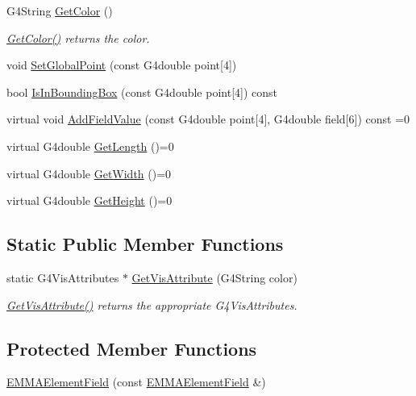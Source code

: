 \begin{DoxyCompactItemize}
G4\+String \hyperlink{classEMMAElementField_a0a67e3bc2f8393d62ee76503f9aeaf7c}{Get\+Color} ()
\begin{DoxyCompactList}\small\item\em \hyperlink{classEMMAElementField_a0a67e3bc2f8393d62ee76503f9aeaf7c}{Get\+Color()} returns the color. \end{DoxyCompactList}\item 
void \hyperlink{classEMMAElementField_af4362c2dbb660e9eaab6d9207e29acda}{Set\+Global\+Point} (const G4double point\mbox{[}4\mbox{]})
\item 
bool \hyperlink{classEMMAElementField_aabb0a5f52245b11bcd16efa8c9dc7338}{Is\+In\+Bounding\+Box} (const G4double point\mbox{[}4\mbox{]}) const 
\item 
virtual void \hyperlink{classEMMAElementField_acec8d9002f079755715ffd5b7ba7e900}{Add\+Field\+Value} (const G4double point\mbox{[}4\mbox{]}, G4double field\mbox{[}6\mbox{]}) const =0
\item 
virtual G4double \hyperlink{classEMMAElementField_adb2d90c3fdf25e17be541903bffca35b}{Get\+Length} ()=0
\item 
virtual G4double \hyperlink{classEMMAElementField_a41708a8f1e72d7788c0a53c80c297bf9}{Get\+Width} ()=0
\item 
virtual G4double \hyperlink{classEMMAElementField_a3cbd223805ba24b5313e16ca540c326c}{Get\+Height} ()=0
\end{DoxyCompactItemize}
\subsection*{Static Public Member Functions}
\begin{DoxyCompactItemize}
\item 
static G4\+Vis\+Attributes $\ast$ \hyperlink{classEMMAElementField_adcc4e33f5615dbf4266823277281bf79}{Get\+Vis\+Attribute} (G4\+String color)
\begin{DoxyCompactList}\small\item\em \hyperlink{classEMMAElementField_adcc4e33f5615dbf4266823277281bf79}{Get\+Vis\+Attribute()} returns the appropriate G4\+Vis\+Attributes. \end{DoxyCompactList}\end{DoxyCompactItemize}
\subsection*{Protected Member Functions}
\begin{DoxyCompactItemize}
\item 
\hyperlink{classEMMAElementField_a6b53a26e3a5e14a3d9eaec5b9c257c31}{E\+M\+M\+A\+Element\+Field} (const \hyperlink{classEMMAElementField}{E\+M\+M\+A\+Element\+Field} \&)
\end{DoxyCompactItemize}
